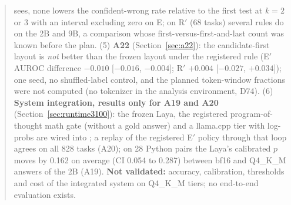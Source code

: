 \documentclass[11pt,a4paper]{article}
\newcommand{\code}[1]{\texttt{\detokenize{#1}}}
\begin{document}
\begin{abstract}
sees, none lowers the confident-wrong rate relative to the first test at $k=2$ or $3$ with an interval excluding zero on E; on R$'$ (68 tasks) several rules do on the 2B and 9B, a comparison whose first-versus-first-and-last count was known before the plan. (5) \textbf{A22} (Section~\ref{sec:a22}): the candidate-first layout is \emph{not} better than the frozen layout under the registered rule (E$'$ AUROC difference $-0.010$ [$-0.016$, $-0.004$]; R$'$ $+0.004$ [$-0.027$, $+0.034$]); one seed, no shuffled-label control, and the planned token-window fractions were not computed (no tokenizer in the analysis environment, D74). (6) \textbf{System integration, results only for A19 and A20} (Section~\ref{sec:runtime3100}): the frozen Laya, the registered program-of-thought math gate (without a gold answer) and a llama.cpp tier with log-probs are wired into \code{GwenLaya}; a replay of the registered E$'$ policy through that loop agrees on all 828 tasks (A20); on 28 Python pairs the Laya's calibrated $p$ moves by 0.162 on average (CI 0.054 to 0.287) between bf16 and Q4\_K\_M answers of the 2B (A19). \textbf{Not validated:} accuracy, calibration, thresholds and cost of the integrated system on Q4\_K\_M tiers; no end-to-end evaluation exists.


\end{abstract}
\end{document}
